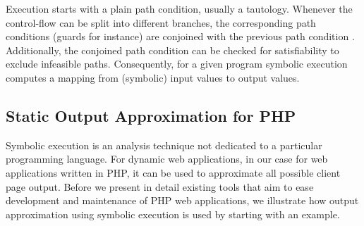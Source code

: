 \documentclass[sigconf]{acmart}
\begin{document}
Execution starts with a plain path condition, usually a tautology. Whenever the
control-flow can be split into different branches, the corresponding path
conditions (guards for instance) are conjoined with the previous path condition
\cite{King1976}. Additionally, the conjoined path condition can be checked for
satisfiability to exclude infeasible paths. Consequently, for a given program
symbolic execution computes a mapping from (symbolic) input values to output values.

\subsection{Static Output Approximation for PHP} \label{sec:workflow}
Symbolic execution is an analysis technique not dedicated to a particular
programming language. For dynamic web applications, in our case for web
applications written in PHP, it can be used to approximate all possible client
page output. Before we present in detail existing tools that aim to ease
development and maintenance of PHP web applications, we illustrate how output
approximation using symbolic execution is used by starting with an example.
\end{document}
